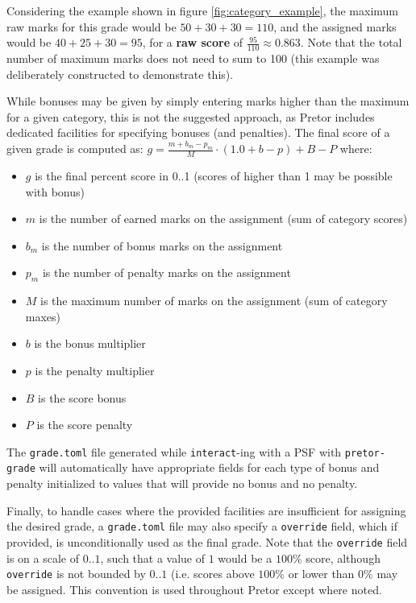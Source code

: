 \documentclass{book}
\begin{document}
Considering the example shown in figure \ref{fig:category_example}, the maximum
raw marks for this grade would be $50+30+30=110$, and the assigned marks would
be $40+25+30=95$, for a \textbf{raw score} of $\frac{95}{110} \approx 0.863$.
Note that the total number of maximum marks does not need to sum to 100 (this
example was deliberately constructed to demonstrate this).

While bonuses may be given by simply entering marks higher than the maximum for
a given category, this is not the suggested approach, as Pretor includes
dedicated facilities for specifying bonuses (and penalties). The final score of
a given grade is computed as: $g = \frac{m + b_m - p_m}{M} \cdot (1.0 + b - p)
+ B - P$ where:

\begin{itemize}

	\item $g$ is the final percent score in 0..1 (scores of higher than 1
		may be possible with bonus)

	\item $m$ is the number of earned marks on the assignment (sum of
		category scores)

	\item $b_m$ is the number of bonus marks on the assignment

	\item $p_m$ is the number of penalty marks on the assignment

	\item $M$ is the maximum number of marks on the assignment (sum of
		category maxes)

	\item $b$ is the bonus multiplier

	\item $p$ is the penalty multiplier

	\item $B$ is the score bonus

	\item $P$ is the score penalty

\end{itemize}

The \texttt{grade.toml} file generated while \texttt{interact}-ing with a PSF
with \texttt{pretor-grade} will automatically have appropriate fields for each
type of bonus and penalty initialized to values that will provide no bonus and
no penalty.

Finally, to handle cases where the provided facilities are insufficient for
assigning the desired grade, a \texttt{grade.toml} file may also specify a
\texttt{override} field, which if provided, is unconditionally used as the
final grade. Note that the \texttt{override} field is on a scale of $0..1$,
such that a value of $1$ would be a $100\%$ score, although \texttt{override}
is not bounded by $0..1$ (i.e. scores above $100\%$ or lower than $0\%$ may be
assigned. This convention is used throughout Pretor except where noted.
\end{document}
